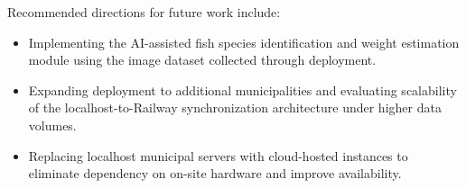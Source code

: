 \documentclass[journal]{IEEEtran}
\begin{document}
Recommended directions for future work include:
\begin{itemize}
    \item Implementing the AI-assisted fish species identification and weight estimation
    module using the image dataset collected through deployment.
    \item Expanding deployment to additional municipalities and evaluating scalability of
    the localhost-to-Railway synchronization architecture under higher data volumes.
    \item Replacing localhost municipal servers with cloud-hosted instances to eliminate
    dependency on on-site hardware and improve availability.
\end{itemize}

\end{document}

